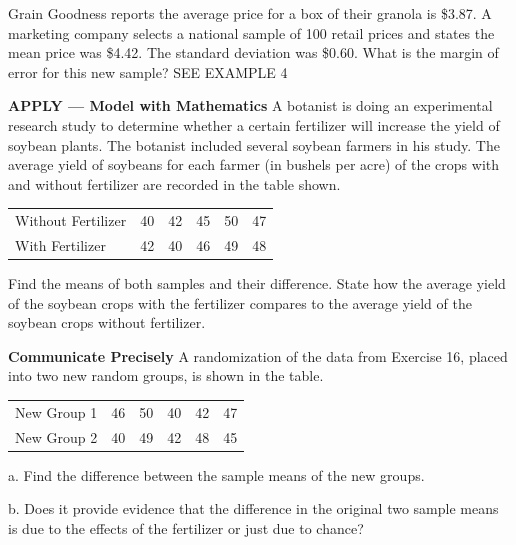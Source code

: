 \documentclass{article}
\newenvironment{practice}[2]{}{}        %
\newcommand{\answer}[1]{}               %
\begin{document}
\begin{practice}{15}{2}
Grain Goodness reports the average price for a box of their granola is \$3.87. A marketing company selects a national sample of 100 retail prices and states the mean price was \$4.42. The standard deviation was \$0.60. What is the margin of error for this new sample? SEE EXAMPLE 4
\answer{(m=0.12)}
\end{practice}
\begin{practice}{16}{2}
\textbf{APPLY — Model with Mathematics} A botanist is doing an experimental research study to determine whether a certain fertilizer will increase the yield of soybean plants. The botanist included several soybean farmers in his study. The average yield of soybeans for each farmer (in bushels per acre) of the crops with and without fertilizer are recorded in the table shown.
\begin{tabular}{lrrrrr}
Without Fertilizer & 40 & 42 & 45 & 50 & 47 \\
With Fertilizer & 42 & 40 & 46 & 49 & 48 \\
\end{tabular}
Find the means of both samples and their difference. State how the average yield of the soybean crops with the fertilizer compares to the average yield of the soybean crops without fertilizer.
\answer{sample mean without fertilizer: (\bar{x}=44.8); sample mean with fertilizer (\bar{x}=45.0); The difference in the sample means is (44.8-45=-0.2). The average yield of bushels of soybeans with the fertilizer is slightly greater than the average yield of the bushels of soybeans without the fertilizer. Since the difference is so small, more testing would definitely be required in order to determine whether the fertilizer was responsible for the higher yield.}
\end{practice}
\begin{practice}{17}{2}
\textbf{Communicate Precisely} A randomization of the data from Exercise 16, placed into two new random groups, is shown in the table.
\begin{tabular}{lrrrrr}
New Group 1 & 46 & 50 & 40 & 42 & 47 \\
New Group 2 & 40 & 49 & 42 & 48 & 45 \\
\end{tabular}
a. Find the difference between the sample means of the new groups.
\answer{a. sample mean new group 1: (\bar{x}=45.0); sample mean new group 2: (\bar{x}=44.8); The difference in the sample means is (45-44.8=0.2).}
b. Does it provide evidence that the difference in the original two sample means is due to the effects of the fertilizer or just due to chance?
\answer{b. The results of the randomization do not provide evidence that the difference in the original two sample means is due to the effects of the fertilizer. Since the difference between the two random groups is as great as the difference between the two original groups, the original difference could be due to chance.}
\end{practice}
\end{document}
